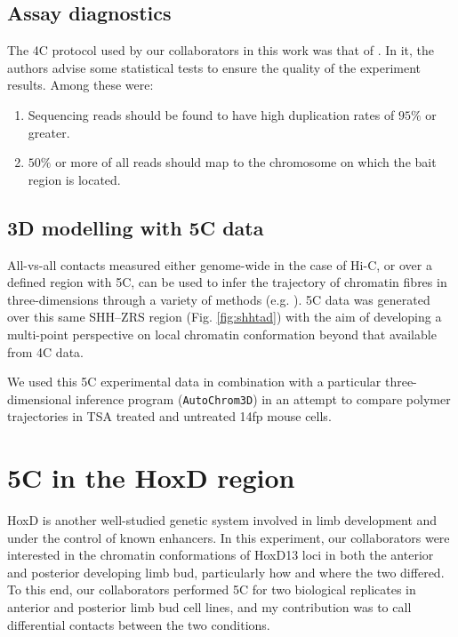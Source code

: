 \documentclass[a4paper,10pt,oneside]{book}
\begin{document}
\subsection{Assay diagnostics}

The 4C protocol used by our collaborators in this work was that of \citet{Stadhouders2013}. In it, the authors advise some statistical tests to ensure the quality of the experiment results. Among these were:\cite{Stadhouders2013}

\begin{enumerate}
\item Sequencing reads should be found to have high duplication rates of $95\%$ or greater.
\item $50\%$ or more of all reads should map to the chromosome on which the bait region is located.
\end{enumerate}

\subsection{3D modelling with 5C data}

All-vs-all contacts measured either genome-wide in the case of Hi-C, or over a defined region with 5C, can be used to infer the trajectory of chromatin fibres in three-dimensions through a variety of methods (e.g. \cite{Bau2011a, Hu2013a, Varoquaux2014a, Lesne2014, Trieu2014, Peng2013, Ay2014b, Caudai2015}). 5C data was generated over this same SHH--ZRS region (Fig. \ref{fig:shhtad}) with the aim of developing a multi-point perspective on local chromatin conformation beyond that available from 4C data.

We used this 5C experimental data in combination with a particular three-dimensional inference program  (\texttt{AutoChrom3D}\cite{Peng2013}) in an attempt to compare polymer trajectories in TSA treated and untreated 14fp mouse cells.

\section{5C in the HoxD region}

HoxD is another well-studied genetic system involved in limb development and under the control of known enhancers. In this experiment, our collaborators were interested in the chromatin conformations of HoxD13 loci in both the anterior and posterior developing limb bud, particularly how and where the two differed. To this end, our collaborators performed 5C for two biological replicates in anterior and posterior limb bud cell lines, and my contribution was to call differential contacts between the two conditions.
\end{document}
